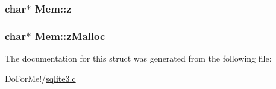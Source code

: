 \hypertarget{struct_mem_a85c51a0b445063ba913693517860f5ea}{
\subsubsection[{z}]{\setlength{\rightskip}{0pt plus 5cm}char$\ast$ Mem\-::z}}\label{struct_mem_a85c51a0b445063ba913693517860f5ea}
\hypertarget{struct_mem_a68cd8f196d9dc8ab27845e1b4abbc95c}{
\subsubsection[{z\-Malloc}]{\setlength{\rightskip}{0pt plus 5cm}char$\ast$ Mem\-::z\-Malloc}}\label{struct_mem_a68cd8f196d9dc8ab27845e1b4abbc95c}


The documentation for this struct was generated from the following file\-:\begin{DoxyCompactItemize}
\item 
Do\-For\-Me!/\hyperlink{sqlite3_8c}{sqlite3.\-c}\end{DoxyCompactItemize}
